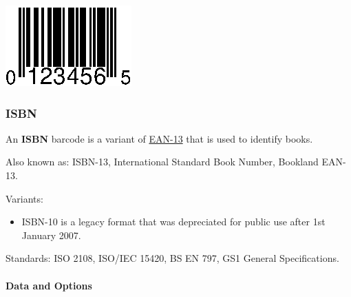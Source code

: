 \includegraphics{images/upce-2.eps}

\hypertarget{isbn}{%
\subsubsection{ISBN}\label{isbn}}

An \textbf{ISBN} barcode is a variant of
\protect\hyperlink{ean-13}{EAN-13} that is used to identify books.

Also known as: ISBN-13, International Standard Book Number, Bookland
EAN-13.

Variants:

\begin{itemize}
\tightlist
\item
  ISBN-10 is a legacy format that was depreciated for public use after
  1st January 2007.
\end{itemize}

Standards: ISO 2108, ISO/IEC 15420, BS EN 797, GS1 General
Specifications.

\hypertarget{data-and-options-4}{%
\paragraph{Data and Options}\label{data-and-options-4}}


